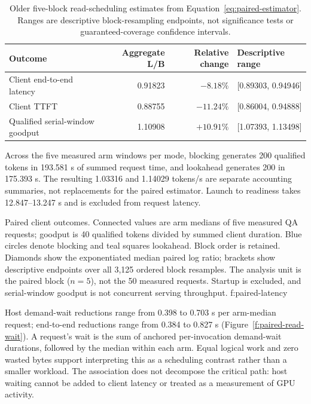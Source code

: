 \begin{table}[!htbp]
\centering
\small
\begin{tabular}{@{}lrrl@{}}
\toprule
Outcome & Aggregate L/B & Relative change & Descriptive range \\
\midrule
Client end-to-end latency & 0.91823 & $-8.18\%$ & [0.89303, 0.94946] \\
Client TTFT & 0.88755 & $-11.24\%$ & [0.86004, 0.94888] \\
Qualified serial-window goodput & 1.10908 & $+10.91\%$ & [1.07393, 1.13498] \\
\bottomrule
\end{tabular}
\caption{Older five-block read-scheduling estimates from Equation~\ref{eq:paired-estimator}.
Ranges are descriptive block-resampling endpoints, not significance tests or
guaranteed-coverage confidence intervals.}
\label{tab:paired-results}
\end{table}

Across the five measured arm windows per mode, blocking generates 200
qualified tokens in 193.581 s of summed request time, and lookahead generates
200 in 175.393 s. The resulting 1.03316 and 1.14029 tokens/s are separate
accounting summaries, not replacements for the paired estimator. Launch to
readiness takes 12.847--13.247 s and is excluded from request latency.

{Paired client outcomes. Connected values are arm medians of five measured
QA requests; goodput is 40 qualified tokens divided by summed client duration.
Blue circles denote blocking and teal squares lookahead. Block order is
retained. Diamonds show the exponentiated median paired log ratio; brackets
show descriptive endpoints over all 3,125 ordered block resamples. The analysis
unit is the paired block ($n=5$), not the 50 measured requests. Startup is
excluded, and serial-window goodput is not concurrent serving throughput.}
{f:paired-latency}

Host demand-wait reductions range from 0.398 to 0.703 s per arm-median request;
end-to-end reductions range from 0.384 to 0.827 s
(Figure~\ref{f:paired-read-wait}). A request's wait is the sum of anchored
per-invocation demand-wait durations, followed by the median within each arm.
Equal logical work and zero wasted bytes support interpreting this as a
scheduling contrast rather than a smaller workload. The association does not
decompose the critical path: host waiting cannot be added to client latency
or treated as a measurement of GPU activity.

